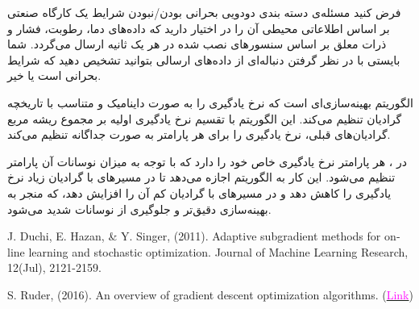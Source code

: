 فرض کنید مسئله‌ی دسته بندی دودویی بحرانی بودن/نبودن شرایط یک کارگاه صنعتی بر اساس اطلاعاتی محیطی آن را در اختیار دارید که داده‌های دما، رطوبت، فشار و ذرات معلق بر اساس سنسورهای نصب شده در هر یک ثانیه ارسال می‌گردد. شما بایستی با در نظر گرفتن دنباله‌ای از داده‌های ارسالی بتوانید تشخیص دهید که شرایط بحرانی است یا خیر.
\begin{qsolve}
الگوریتم بهینه‌سازی‌ای است که نرخ یادگیری را به صورت داینامیک و متناسب با تاریخچه گرادیان‌ تنظیم می‌کند. این الگوریتم با تقسیم نرخ یادگیری اولیه بر مجموع ریشه مربع گرادیان‌های قبلی، نرخ یادگیری را برای هر پارامتر به صورت جداگانه تنظیم می‌کند.

در ، هر پارامتر نرخ یادگیری خاص خود را دارد که با توجه به میزان نوسانات آن پارامتر تنظیم می‌شود. این کار به الگوریتم اجازه می‌دهد تا در مسیرهای با گرادیان زیاد نرخ یادگیری را کاهش دهد و در مسیرهای با گرادیان کم آن را افزایش دهد، که منجر به بهینه‌سازی دقیق‌تر و جلوگیری از نوسانات شدید می‌شود.
 \begin{latin}
	\begin{thebibliography}{9}
		J. Duchi, E. Hazan, \& Y. Singer, (2011). Adaptive subgradient methods for online learning and stochastic optimization. Journal of Machine Learning Research, 12(Jul), 2121-2159.
		
		S. Ruder, (2016). An overview of gradient descent optimization algorithms. (\href{https://arxiv.org/abs/1609.04747}{\textcolor{magenta}{Link}})
	\end{thebibliography} 
\end{latin}
\end{qsolve}




































